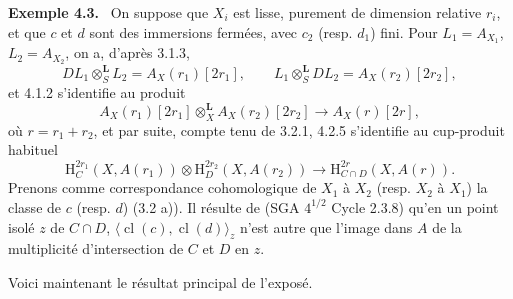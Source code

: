 \documentclass[11pt]{article}
\newenvironment{statement}[1]{\par\medskip\noindent\textbf{#1.}\ }{\par\medskip}
\renewcommand{\H}{\mathrm{H}}
\providecommand{\cl}{\operatorname{cl}}
\providecommand{\cl}{\operatorname{cl}}
\begin{document}
\begin{statement}{Exemple 4.3}
On suppose que $X_i$ est lisse, purement de dimension relative $r_i$, et que $c$ et $d$ sont des immersions fermées, avec $c_2$ (resp. $d_1$) fini. Pour $L_1=A_{X_1}$, $L_2=A_{X_2}$, on a, d'après 3.1.3,
\[
DL_1\otimes_S^{\mathbf L}L_2=A_X(r_1)[2r_1],\qquad
L_1\otimes_S^{\mathbf L}DL_2=A_X(r_2)[2r_2],
\]
et 4.1.2 s'identifie au produit
\[
A_X(r_1)[2r_1]\otimes_X^{\mathbf L}A_X(r_2)[2r_2]\longrightarrow A_X(r)[2r],
\]
où $r=r_1+r_2$, et par suite, compte tenu de 3.2.1, 4.2.5 s'identifie au cup-produit habituel
\[
\H_C^{2r_1}(X,A(r_1))\otimes \H_D^{2r_2}(X,A(r_2))
\longrightarrow
\H_{C\cap D}^{2r}(X,A(r)).
\]
Prenons comme correspondance cohomologique de $X_1$ à $X_2$ (resp. $X_2$ à $X_1$) la classe de $c$ (resp. $d$) (3.2 a)). Il résulte de (SGA $4^{1/2}$ Cycle 2.3.8) qu'en un point isolé $z$ de $C\cap D$, $\langle \cl(c),\cl(d)\rangle_z$ n'est autre que l'image dans $A$ de la multiplicité d'intersection de $C$ et $D$ en $z$.
\end{statement}

Voici maintenant le résultat principal de l'exposé.
\end{document}
